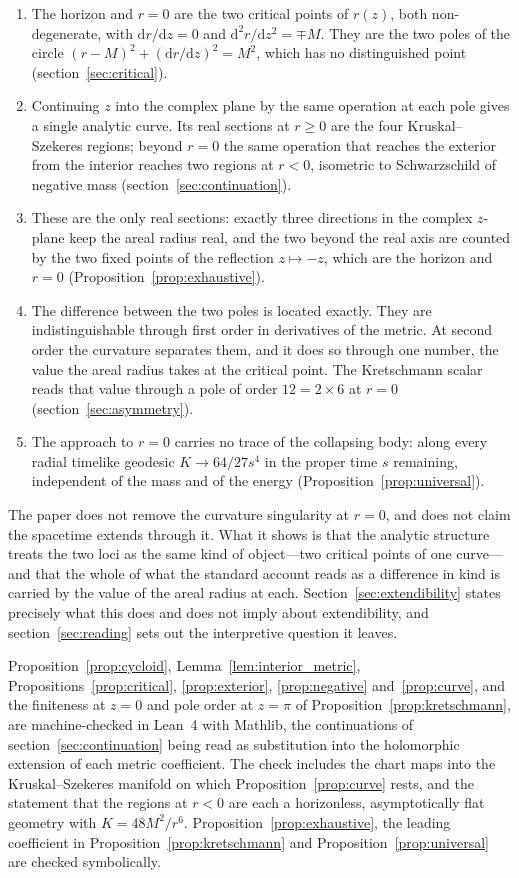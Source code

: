 \documentclass{iopjournal}
\theoremstyle{plain}
\theoremstyle{remark}
\newcommand{\dd}{\mathrm{d}}
\begin{document}
\begin{enumerate}
\item The horizon and $r=0$ are the two critical points of $r(z)$, both non-degenerate, with $\dd r/\dd z=0$ and $\dd^{2}r/\dd z^{2}=\mp M$. They are the two poles of the circle $(r-M)^2+(\dd r/\dd z)^2=M^2$, which has no distinguished point (section~\ref{sec:critical}).
\item Continuing $z$ into the complex plane by the same operation at each pole gives a single analytic curve. Its real sections at $r\geq0$ are the four Kruskal--Szekeres regions; beyond $r=0$ the same operation that reaches the exterior from the interior reaches two regions at $r<0$, isometric to Schwarzschild of negative mass (section~\ref{sec:continuation}).
\item These are the only real sections: exactly three directions in the complex $z$-plane keep the areal radius real, and the two beyond the real axis are counted by the two fixed points of the reflection $z\mapsto-z$, which are the horizon and $r=0$ (Proposition~\ref{prop:exhaustive}).
\item The difference between the two poles is located exactly. They are indistinguishable through first order in derivatives of the metric. At second order the curvature separates them, and it does so through one number, the value the areal radius takes at the critical point. The Kretschmann scalar reads that value through a pole of order $12=2\times6$ at $r=0$ (section~\ref{sec:asymmetry}).
\item The approach to $r=0$ carries no trace of the collapsing body: along every radial timelike geodesic $K\to64/27s^{4}$ in the proper time $s$ remaining, independent of the mass and of the energy (Proposition~\ref{prop:universal}).
\end{enumerate}

The paper does not remove the curvature singularity at $r=0$, and does not claim the spacetime extends through it. What it shows is that the analytic structure treats the two loci as the same kind of object---two critical points of one curve---and that the whole of what the standard account reads as a difference in kind is carried by the value of the areal radius at each. Section~\ref{sec:extendibility} states precisely what this does and does not imply about extendibility, and section~\ref{sec:reading} sets out the interpretive question it leaves.

Proposition~\ref{prop:cycloid}, Lemma~\ref{lem:interior_metric}, Propositions~\ref{prop:critical}, \ref{prop:exterior}, \ref{prop:negative} and~\ref{prop:curve}, and the finiteness at $z=0$ and pole order at $z=\pi$ of Proposition~\ref{prop:kretschmann}, are machine-checked in Lean~4 with Mathlib, the continuations of section~\ref{sec:continuation} being read as substitution into the holomorphic extension of each metric coefficient. The check includes the chart maps into the Kruskal--Szekeres manifold on which Proposition~\ref{prop:curve} rests, and the statement that the regions at $r<0$ are each a horizonless, asymptotically flat geometry with $K=48M^{2}/r^{6}$. Proposition~\ref{prop:exhaustive}, the leading coefficient in Proposition~\ref{prop:kretschmann} and Proposition~\ref{prop:universal} are checked symbolically.
\end{document}

